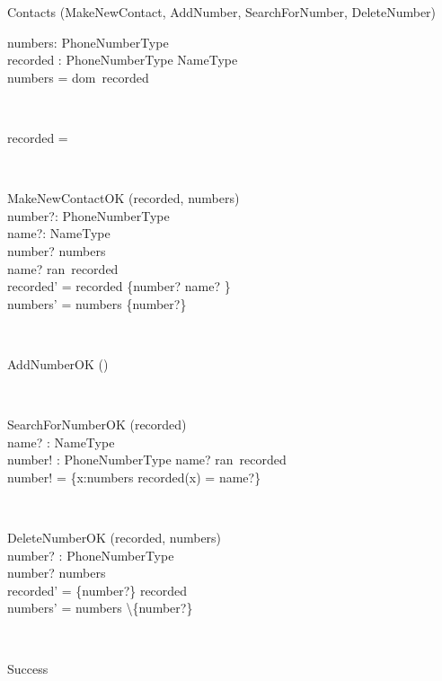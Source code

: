 \begin{class}{Contacts}
\also
\upharpoonright (MakeNewContact, AddNumber, SearchForNumber, DeleteNumber) \\
\begin{state}
numbers:  PhoneNumberType\\
recorded : PhoneNumberType \pfun NameType\\
\where
numbers = dom~recorded
\end{state} \\
\begin{init}
recorded = \emptyset %
\end{init} \\
\begin{op}{MakeNewContactOK}
\Delta (recorded, numbers) \\
number?: PhoneNumberType \\
name?: NameType \\
\ST
number? \notin numbers \\
name? \notin ran~recorded \\
recorded' = recorded \cup \{number? \mapsto name? \}\\
numbers' = numbers \cup \{number?\} \\
\end{op}\\
\begin{op}{AddNumberOK}
\Delta () \\
\ST
\end{op}\\
\begin{op}{SearchForNumberOK}
    \Xi (recorded) \\
    name? : NameType\\
    number! :  PhoneNumberType
    \ST
    name? \in ran~recorded\\
    number! = \{x:numbers  \mid recorded(x) = name?\}
\end{op}\\
\begin{op}{DeleteNumberOK}
\Delta (recorded, numbers) \\
number? : PhoneNumberType\\
\ST
number? \in numbers\\
recorded' = \{number?\} \ndres recorded\\
numbers' = numbers \backslash \{number?\}\\
\end{op}\\
\begin{op}{Success}

\end{op}
\end{class}
